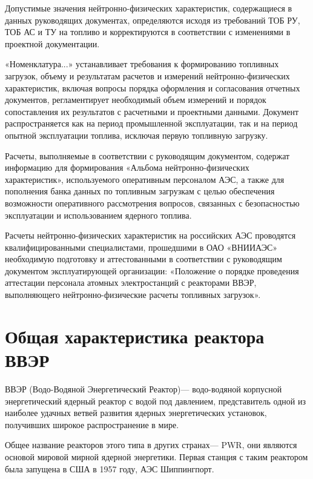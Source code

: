 \documentclass[14pt]{article}
\begin{document}
	Допустимые значения нейтронно-физических характеристик, содержащиеся в данных руководящих  документах,  определяются  исходя  из  требований  ТОБ  РУ,  ТОБ  АС  и  ТУ  на топливо и корректируются в соответствии с изменениями в проектной документации. 
	
	«Номенклатура...»  устанавливает  требования  к  формированию  топливных  загрузок, объему и результатам расчетов и измерений нейтронно-физических характеристик, включая вопросы  порядка  оформления  и  согласования  отчетных документов,  регламентирует необходимый  объем  измерений  и  порядок  сопоставления  их  результатов  с  расчетными  и проектными   данными.   Документ   распространяется   как   на   период   промышленной эксплуатации, так и на период опытной эксплуатации топлива, исключая первую топливную загрузку. 
	
	Расчеты,  выполняемые  в  соответствии  с  руководящим  документом,  содержат информацию   для   формирования   «Альбома   нейтронно-физических   характеристик», используемого  оперативным  персоналом  АЭС,  а  также  для  пополнения  банка  данных  по топливным  загрузкам  с  целью  обеспечения  возможности  оперативного  рассмотрения вопросов, связанных с безопасностью эксплуатации и использованием ядерного топлива. 
	
	Расчеты  нейтронно-физических  характеристик  на  российских  АЭС  проводятся квалифицированными  специалистами,  прошедшими  в  ОАО «ВНИИАЭС»  необходимую подготовку и аттестованными в соответствии с руководящим документом эксплуатирующей организации:   «Положение   о   порядке   проведения   аттестации   персонала   атомных электростанций   с   реакторами   ВВЭР,   выполняющего   нейтронно-физические   расчеты топливных загрузок». 
	
	\section{Общая характеристика реактора ВВЭР}
	\hspace{0.4cm}
	ВВЭР (Водо-Водяной Энергетический Реактор)— водо-водяной корпусной энергетический ядерный реактор с водой под давлением, представитель одной из наиболее удачных ветвей развития ядерных энергетических установок, получивших широкое распространение в мире. 
	
Общее название реакторов этого типа в других странах— PWR, они являются основой мировой мирной ядерной энергетики. Первая станция с таким реактором была запущена в США в 1957 году, АЭС Шиппингпорт. 
\end{document}
